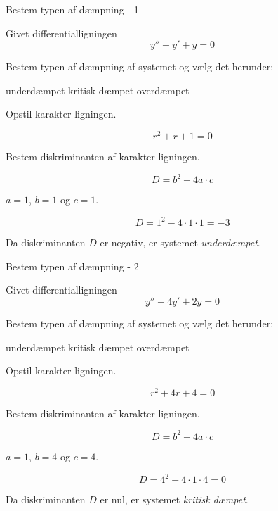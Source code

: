 \documentclass{article}
\begin{document}
\tableofcontents
\newpage

\begin{exercise}{Bestem typen af dæmpning - 1}

Givet differentialligningen
\[
y'' + y' + y = 0
\]

Bestem typen af dæmpning af systemet og vælg det herunder:
\begin{multichoice}
\itemtrue underdæmpet
\itemfalse kritisk dæmpet
\itemfalse overdæmpet
\end{multichoice}


\hint
Opstil karakter ligningen.

\hint
\[
r^2 + r + 1 = 0
\]

\hint
Bestem diskriminanten af karakter ligningen.

\hint
\[
D = b^2 - 4 a \cdot c
\]

\hint
$a = 1$, $b = 1$ og $c = 1$.

\hint
\[
D = 1^2 - 4 \cdot 1 \cdot 1 = -3
\]

\hint
Da diskriminanten $D$ er negativ, er systemet \emph{underdæmpet}.

\end{exercise}

\newpage

\begin{exercise}{Bestem typen af dæmpning - 2}

Givet differentialligningen
\[
y'' + 4 y' + 2 y = 0
\]

Bestem typen af dæmpning af systemet og vælg det herunder:
\begin{multichoice}
\itemfalse underdæmpet
\itemtrue kritisk dæmpet
\itemfalse overdæmpet
\end{multichoice}


\hint
Opstil karakter ligningen.

\hint
\[
r^2 + 4 r + 4 = 0
\]

\hint
Bestem diskriminanten af karakter ligningen.

\hint
\[
D = b^2 - 4 a \cdot c
\]

\hint
$a = 1$, $b = 4$ og $c = 4$.

\hint
\[
D = 4^2 - 4 \cdot 1 \cdot 4 = 0
\]

\hint
Da diskriminanten $D$ er nul, er systemet \emph{kritisk dæmpet}.

\end{exercise}

\newpage
\end{document}
